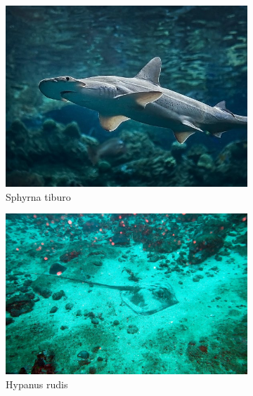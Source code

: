 \documentclass[10pt]{article}
\begin{document}


\begin{figure}
     \centering
     \begin{subfigure}[b]{0.45\textwidth}
         \centering
         \includegraphics[width=\textwidth]{images/sphyrna_tiburo.jpg}
         \caption{Sphyrna tiburo}
     \end{subfigure}
     \hfill
     \begin{subfigure}[b]{0.45\textwidth}
         \centering
         \includegraphics[width=\textwidth]{images/hypanus_rudis.jpg}
         \caption{Hypanus rudis}
     \end{subfigure}
     \hfill
     \begin{subfigure}[b]{0.45\textwidth}
         \centering

\end{subfigure}
\end{figure}
\end{document}
